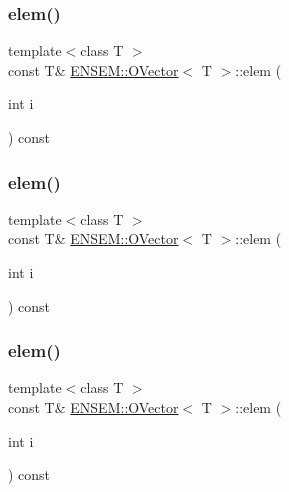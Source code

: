 \mbox{\label{classENSEM_1_1OVector_afddf0b325b50484d1c8f0ab8f0abd3c8}} 
\subsubsection{\texorpdfstring{elem()}{elem()}\hspace{0.1cm}{\footnotesize\ttfamily [4/6]}}
{\footnotesize\ttfamily template$<$class T $>$ \\
const T\& \mbox{\hyperlink{classENSEM_1_1OVector}{E\+N\+S\+E\+M\+::\+O\+Vector}}$<$ T $>$\+::elem (\begin{DoxyParamCaption}\item[{int}]{i }\end{DoxyParamCaption}) const\hspace{0.3cm}{\ttfamily [inline]}}

\mbox{\label{classENSEM_1_1OVector_afddf0b325b50484d1c8f0ab8f0abd3c8}} 
\subsubsection{\texorpdfstring{elem()}{elem()}\hspace{0.1cm}{\footnotesize\ttfamily [5/6]}}
{\footnotesize\ttfamily template$<$class T $>$ \\
const T\& \mbox{\hyperlink{classENSEM_1_1OVector}{E\+N\+S\+E\+M\+::\+O\+Vector}}$<$ T $>$\+::elem (\begin{DoxyParamCaption}\item[{int}]{i }\end{DoxyParamCaption}) const\hspace{0.3cm}{\ttfamily [inline]}}

\mbox{\label{classENSEM_1_1OVector_afddf0b325b50484d1c8f0ab8f0abd3c8}} 
\subsubsection{\texorpdfstring{elem()}{elem()}\hspace{0.1cm}{\footnotesize\ttfamily [6/6]}}
{\footnotesize\ttfamily template$<$class T $>$ \\
const T\& \mbox{\hyperlink{classENSEM_1_1OVector}{E\+N\+S\+E\+M\+::\+O\+Vector}}$<$ T $>$\+::elem (\begin{DoxyParamCaption}\item[{int}]{i }\end{DoxyParamCaption}) const\hspace{0.3cm}{\ttfamily [inline]}}

